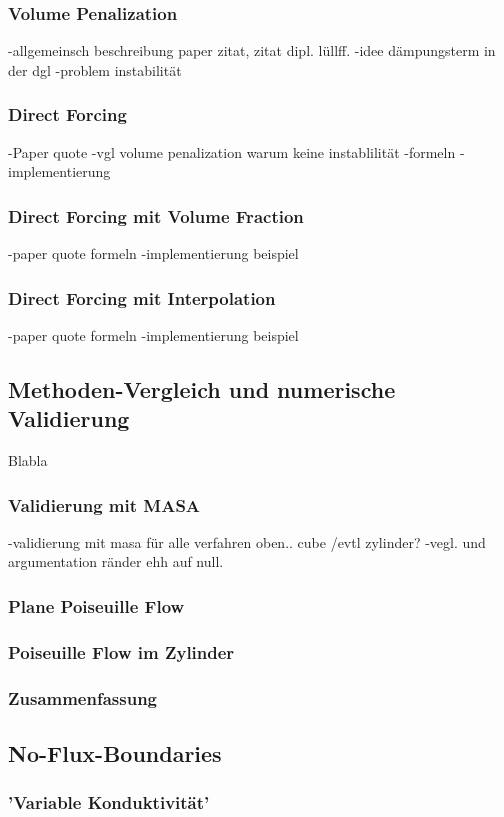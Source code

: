 \subsubsection{Volume Penalization}
-allgemeinsch beschreibung paper zitat, zitat dipl. lüllff.
-idee dämpungsterm in der dgl
-problem instabilität

\subsubsection{Direct Forcing}
-Paper quote
-vgl volume penalization warum keine instablilität
-formeln
-implementierung

\subsubsection{Direct Forcing mit Volume Fraction}
-paper quote formeln
-implementierung beispiel

\subsubsection{Direct Forcing mit Interpolation}
-paper quote formeln
-implementierung beispiel

\subsection{Methoden-Vergleich und numerische Validierung}
Blabla
\subsubsection{Validierung mit MASA}
-validierung mit masa für alle verfahren oben.. cube /evtl zylinder?
-vegl. und argumentation ränder ehh auf null.

\subsubsection{Plane Poiseuille Flow}
\subsubsection{Poiseuille Flow im Zylinder}

\subsubsection{Zusammenfassung}


\subsection{No-Flux-Boundaries}

\subsubsection{'Variable Konduktivität'}











